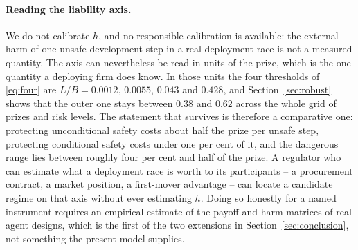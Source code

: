 \documentclass[11pt,a4paper]{article}
\theoremstyle{definition}
\begin{document}
\paragraph{Reading the liability axis.}
We do not calibrate $h$, and no responsible calibration is available: the
external harm of one unsafe development step in a real deployment race is not
a measured quantity. The axis can nevertheless be read in units of the prize,
which is the one quantity a deploying firm does know. In those units the four
thresholds of \eqref{eq:four} are $L/B=0.0012$, $0.0055$, $0.043$ and $0.428$,
and Section~\ref{sec:robust} shows that the outer one stays between $0.38$ and
$0.62$ across the whole grid of prizes and risk levels. The statement that
survives is therefore a comparative one: protecting unconditional safety costs
about half the prize per unsafe step, protecting conditional safety costs
under one per cent of it, and the dangerous range lies between roughly four
per cent and half of the prize. A regulator who can estimate what a deployment
race is worth to its participants -- a procurement contract, a market
position, a first-mover advantage -- can locate a candidate regime on that
axis without ever estimating $h$. Doing so honestly for a named instrument
requires an empirical estimate of the payoff and harm matrices of real agent
designs, which is the first of the two extensions in
Section~\ref{sec:conclusion}, not something the present model supplies.
\end{document}
